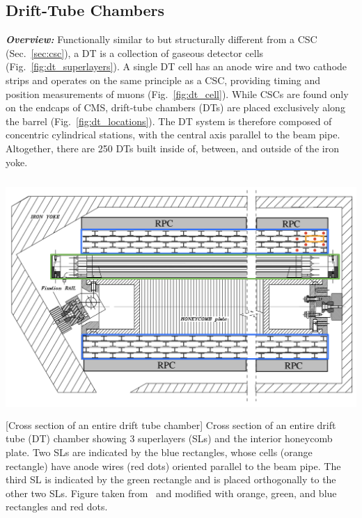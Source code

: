 \subsection{Drift-Tube Chambers}
\label{sec:dt}

\textbf{\textit{Overview:}}
Functionally similar to but structurally different from a CSC (Sec.~\ref{sec:csc}), a DT is a collection of gaseous detector cells (Fig.~\ref{fig:dt_superlayers}).
A single DT cell has an anode wire and two cathode strips and operates on the same principle as a CSC, providing timing and position measurements of muons (Fig.~\ref{fig:dt_cell}).
While CSCs are found only on the endcaps of CMS, drift-tube chambers (DTs) are placed exclusively along the barrel (Fig.~\ref{fig:dt_locations}).
The DT system is therefore composed of concentric cylindrical stations, with the central axis parallel to the beam pipe.
Altogether, there are 250 DTs built inside of, between, and outside of the iron yoke.
\begin{multiFigure}
    \centering
        \includegraphics[height=9cm,keepaspectratio]{figures/cms/muonsys/drifttube_superlayers.jpeg}
        [Cross section of an entire drift tube chamber]
        {Cross section of an entire drift tube (DT) chamber showing 3 superlayers (SLs) and the interior honeycomb plate.
        Two SLs are indicated by the blue rectangles, whose cells (orange rectangle) have anode wires (red dots) oriented parallel to the beam pipe.
        The third SL is indicated by the green rectangle and is placed orthogonally to the other two SLs.
        Figure taken from~\cite{collaboration_cms_2008} and modified with orange, green, and blue rectangles and red dots.}
    \label{fig:dt_superlayers}
\end{multiFigure}
